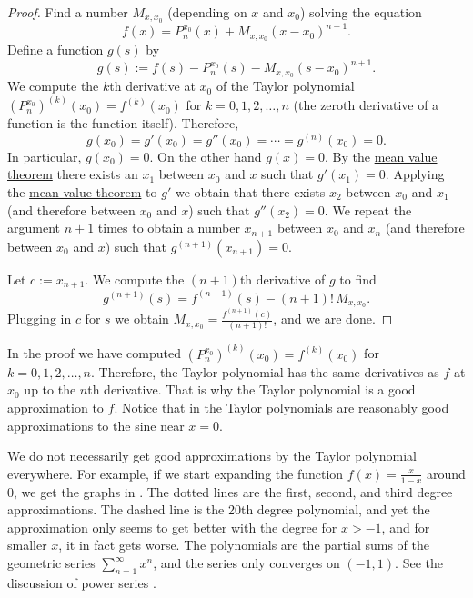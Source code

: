 \begin{proof}
Find a number $M_{x,x_0}$ (depending on $x$ and $x_0$) solving the equation
\begin{equation*}
f(x)=P_{n}^{x_0}(x)+M_{x,x_0}{(x-x_0)}^{n+1} .
\end{equation*}
Define a function $g(s)$ by
\begin{equation*}
g(s) := f(s)-P_n^{x_0}(s)-M_{x,x_0}{(s-x_0)}^{n+1} .
\end{equation*}
We compute
the $k$th derivative at $x_0$ of the Taylor polynomial
${(P_n^{x_0})}^{(k)}(x_0) = f^{(k)}(x_0)$ for
$k=0,1,2,\ldots,n$ (the zeroth derivative of a function is the function
itself).  Therefore,
\begin{equation*}
g(x_0) = g'(x_0) = g''(x_0) = \cdots = g^{(n)}(x_0) = 0 .
\end{equation*}
In particular, $g(x_0) = 0$.
On the other hand $g(x) = 0$.  By the
\hyperref[thm:mvt]{mean value theorem}
there exists an $x_1$ between $x_0$ and $x$ such that $g'(x_1) = 0$.
Applying the \hyperref[thm:mvt]{mean value theorem}
to $g'$ we obtain that there exists
$x_2$ between $x_0$ and $x_1$ (and therefore between $x_0$ and $x$)
such that $g''(x_2) = 0$.  We repeat the
argument $n+1$ times to obtain a number $x_{n+1}$ between $x_0$ and $x_n$
(and therefore between $x_0$ and $x$) such that $g^{(n+1)}(x_{n+1}) = 0$.

Let $c:=x_{n+1}$.
We compute the $(n+1)$th derivative of $g$ to find
\begin{equation*}
g^{(n+1)}(s) = f^{(n+1)}(s)-(n+1)!\,M_{x,x_0} .
\end{equation*}
Plugging in $c$ for $s$ we obtain $M_{x,x_0} = \frac{f^{(n+1)}(c)}{(n+1)!}$, and
we are done.
\end{proof}

In the proof we have computed 
${(P_n^{x_0})}^{(k)}(x_0) = f^{(k)}(x_0)$ for $k=0,1,2,\ldots,n$.
Therefore, the Taylor polynomial has the same derivatives as $f$ at $x_0$
up to the $n$th derivative.  That is why the Taylor polynomial is
a good approximation to $f$.
Notice that in  the Taylor polynomials are
reasonably good approximations to the sine near $x=0$.

We do not necessarily get good approximations
by the Taylor polynomial everywhere.
For example, if we start expanding the function $f(x) =
\frac{x}{1-x}$ around 0, we get the graphs in
.  The dotted lines are the first, second, and
third degree approximations.  The dashed line is
the 20th degree polynomial, and yet the approximation only seems to get
better with the degree for $x > -1$, and for smaller $x$, it in fact gets worse.
The polynomials
are the partial sums of the geometric series $\sum_{n=1}^\infty x^n$,
and the series only converges on $(-1,1)$.
See the discussion of power series
.

